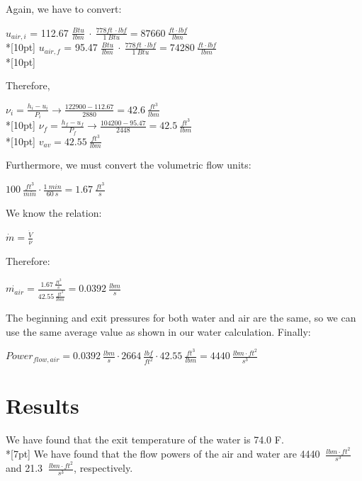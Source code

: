 \documentclass{article}
\begin{document}
Again, we have to convert:
\begin{center}
    \(u_{air, i}\) = 112.67 \(\displaystyle \frac{Btu}{lbm}\ \cdot\: \frac{778 ft\:\cdot lbf}{1 \:Btu} = 87660\:\)\(\displaystyle\frac{ft\cdot lbf}{lbm}\)\\*[10pt]
    \(u_{air, f}\) = 95.47 \(\displaystyle \frac{Btu}{lbm}\ \cdot\: \frac{778 ft\:\cdot lbf}{1\: Btu} = 74280\:\)\(\displaystyle\frac{ft\cdot lbf}{lbm}\)\\*[10pt]
\end{center}
Therefore,
\begin{center}
    \(\displaystyle\nu_i = \frac{h_i - u_i}{P_i}\rightarrow \frac{122900 - 112.67}{2880} = 42.6\:\frac{ft^3}{lbm}\)\\*[10pt]
    \(\displaystyle\nu_f = \frac{h_f - u_f}{P_f}\rightarrow \frac{104200 - 95.47}{2448} = 42.5\:\frac{ft^3}{lbm}\)\\*[10pt]
    \(v_{av} = 42.55\:\frac{ft^3}{lbm}\)
\end{center}
Furthermore, we must convert the volumetric flow units:
\begin{center}
    \(\displaystyle100\:\frac{ft^3}{min} \cdot \frac{1\:min}{60\:s} = 1.67\:\frac{ft^3}{s}\)
\end{center}
We know the relation:
\begin{center}
    \(\displaystyle\dot{m} = \frac{\dot{V}}{\nu}\)
\end{center}
Therefore:
\begin{center}
    \(\displaystyle\dot{m_{air}} = \frac{{1.67 \:\frac{ft^3}{s}}}{42.55\:\frac{ft^3}{lbm}} = 0.0392\:\frac{lbm}{s}\)
\end{center}
The beginning and exit pressures for both water and air are the same, so we can use the same average value as shown in our water calculation. Finally:
\begin{center}
    \(\displaystyle Power_{flow, air} = 0.0392 \:\frac{lbm}{s}\cdot 2664\: \frac{lbf}{ft^2}\cdot42.55 \:\frac{ft^3}{lbm} = 4440 \:\frac{lbm\cdot ft^2}{s^3}\)
\end{center}
\clearpage \noindent
\section{Results}
We have found that the exit temperature of the water is 74.0 \textdegree F.\\*[7pt]
We have found that the flow powers of the air and water are 4440 \(\displaystyle\:\frac{lbm\cdot ft^2}{s^3}\) and 21.3 \(\displaystyle\:\frac{lbm\cdot ft^2}{s^3}\), respectively.
\end{document}
